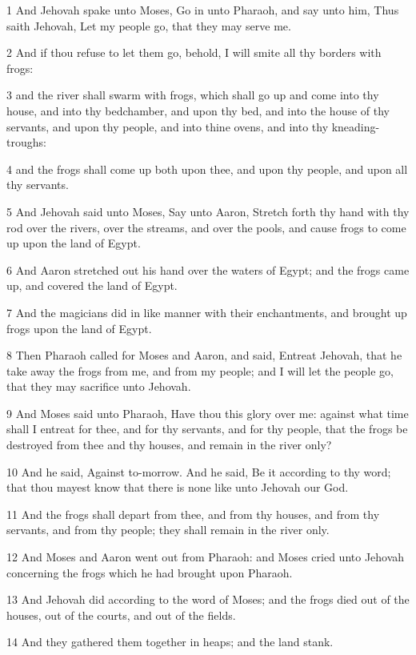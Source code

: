 \par 1 And Jehovah spake unto Moses, Go in unto Pharaoh, and say unto him, Thus saith Jehovah, Let my people go, that they may serve me.
\par 2 And if thou refuse to let them go, behold, I will smite all thy borders with frogs:
\par 3 and the river shall swarm with frogs, which shall go up and come into thy house, and into thy bedchamber, and upon thy bed, and into the house of thy servants, and upon thy people, and into thine ovens, and into thy kneading-troughs:
\par 4 and the frogs shall come up both upon thee, and upon thy people, and upon all thy servants.
\par 5 And Jehovah said unto Moses, Say unto Aaron, Stretch forth thy hand with thy rod over the rivers, over the streams, and over the pools, and cause frogs to come up upon the land of Egypt.
\par 6 And Aaron stretched out his hand over the waters of Egypt; and the frogs came up, and covered the land of Egypt.
\par 7 And the magicians did in like manner with their enchantments, and brought up frogs upon the land of Egypt.
\par 8 Then Pharaoh called for Moses and Aaron, and said, Entreat Jehovah, that he take away the frogs from me, and from my people; and I will let the people go, that they may sacrifice unto Jehovah.
\par 9 And Moses said unto Pharaoh, Have thou this glory over me: against what time shall I entreat for thee, and for thy servants, and for thy people, that the frogs be destroyed from thee and thy houses, and remain in the river only?
\par 10 And he said, Against to-morrow. And he said, Be it according to thy word; that thou mayest know that there is none like unto Jehovah our God.
\par 11 And the frogs shall depart from thee, and from thy houses, and from thy servants, and from thy people; they shall remain in the river only.
\par 12 And Moses and Aaron went out from Pharaoh: and Moses cried unto Jehovah concerning the frogs which he had brought upon Pharaoh.
\par 13 And Jehovah did according to the word of Moses; and the frogs died out of the houses, out of the courts, and out of the fields.
\par 14 And they gathered them together in heaps; and the land stank.
